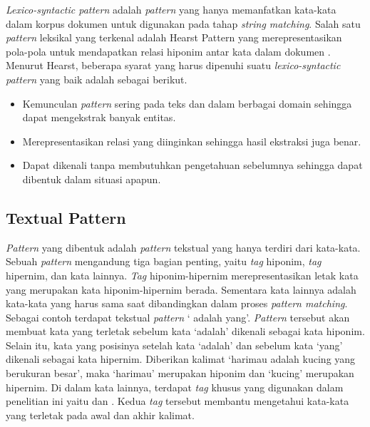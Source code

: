 \textit{Lexico-syntactic pattern} adalah \textit{pattern} yang hanya memanfatkan kata-kata dalam korpus dokumen untuk digunakan pada tahap \textit{string matching}. Salah satu \textit{pattern} leksikal yang terkenal adalah Hearst Pattern yang merepresentasikan pola-pola untuk mendapatkan relasi hiponim antar kata dalam dokumen \citep{hearst1992automatic}. Menurut Hearst, beberapa syarat yang harus dipenuhi suatu \textit{lexico-syntactic pattern} yang baik adalah sebagai berikut.
\begin{itemize}
  \item Kemunculan \textit{pattern} sering pada teks dan dalam berbagai domain sehingga dapat mengekstrak banyak entitas.
  \item Merepresentasikan relasi yang diinginkan sehingga hasil ekstraksi juga benar.
  \item Dapat dikenali tanpa membutuhkan pengetahuan sebelumnya sehingga dapat dibentuk dalam situasi apapun.
\end{itemize}

\subsection{Textual Pattern}
\textit{Pattern} yang dibentuk adalah \textit{pattern} tekstual yang hanya terdiri dari kata-kata. Sebuah \textit{pattern} mengandung tiga bagian penting, yaitu \textit{tag} hiponim, \textit{tag} hipernim, dan kata lainnya. \textit{Tag} hiponim-hipernim merepresentasikan letak kata yang merupakan kata hiponim-hipernim berada. Sementara kata lainnya adalah kata-kata yang harus sama saat dibandingkan dalam proses \textit{pattern matching}. Sebagai contoh terdapat tekstual \textit{pattern} `{\tagHyponym} adalah {\tagHypernym} yang'. \textit{Pattern} tersebut akan membuat kata yang terletak sebelum kata `adalah' dikenali sebagai kata hiponim. Selain itu, kata yang posisinya setelah kata `adalah' dan sebelum kata `yang' dikenali sebagai kata hipernim. Diberikan kalimat `harimau adalah kucing yang berukuran besar', maka `harimau' merupakan hiponim dan `kucing' merupakan hipernim. Di dalam kata lainnya, terdapat \textit{tag} khusus yang digunakan dalam penelitian ini yaitu {\tagStart} dan {\tagEnd}. Kedua \textit{tag} tersebut membantu mengetahui kata-kata yang terletak pada awal dan akhir kalimat.

